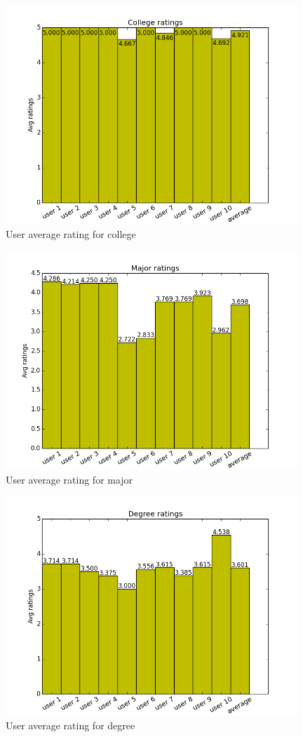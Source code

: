 \begin{figure}[H]
\centering
\includegraphics[width=110mm]{images/evaluation/average_college_score.png}
\caption{User average rating for college}
\label{fig:college}
\end{figure}

\begin{figure}[H]
\centering
\includegraphics[width=110mm]{images/evaluation/average_major_score.png}
\caption{User average rating for major}
\label{fig:major}
\end{figure}

\begin{figure}[H]
\centering
\includegraphics[width=110mm]{images/evaluation/average_degree_score.png}
\caption{User average rating for degree}
\label{fig:degree}
\end{figure}

